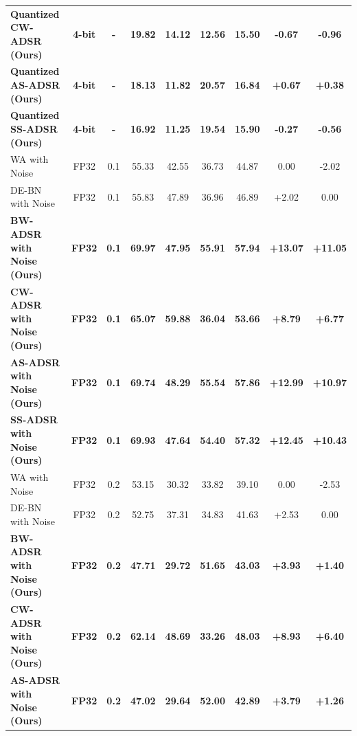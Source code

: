 \documentclass{article}
\theoremstyle{plain}
\theoremstyle{definition}
\theoremstyle{remark}
\begin{document}
\begin{table}[t]
\begin{center}
\begin{small}
\begin{sc}
\begin{tabular}{lcccccccc}
\textbf{Quantized CW-ADSR (Ours)} & \textbf{4-bit} & \textbf{-} & \textbf{19.82} & \textbf{14.12} & \textbf{12.56} & \textbf{15.50} & \textbf{-0.67} & \textbf{-0.96} \\
\textbf{Quantized AS-ADSR (Ours)} & \textbf{4-bit} & \textbf{-} & \textbf{18.13} & \textbf{11.82} & \textbf{20.57} & \textbf{16.84} & \textbf{+0.67} & \textbf{+0.38} \\
\textbf{Quantized SS-ADSR (Ours)} & \textbf{4-bit} & \textbf{-} & \textbf{16.92} & \textbf{11.25} & \textbf{19.54} & \textbf{15.90} & \textbf{-0.27} & \textbf{-0.56} \\
\midrule
WA with Noise & FP32 & 0.1 & 55.33 & 42.55 & 36.73 & 44.87 & 0.00 & -2.02 \\
DE-BN with Noise & FP32 & 0.1 & 55.83 & 47.89 & 36.96 & 46.89 & +2.02 & 0.00 \\
\textbf{BW-ADSR with Noise (Ours)} & \textbf{FP32} & \textbf{0.1} & \textbf{69.97} & \textbf{47.95} & \textbf{55.91} & \textbf{57.94} & \textbf{+13.07} & \textbf{+11.05} \\
\textbf{CW-ADSR with Noise (Ours)} & \textbf{FP32} & \textbf{0.1} & \textbf{65.07} & \textbf{59.88} & \textbf{36.04} & \textbf{53.66} & \textbf{+8.79} & \textbf{+6.77} \\
\textbf{AS-ADSR with Noise (Ours)} & \textbf{FP32} & \textbf{0.1} & \textbf{69.74} & \textbf{48.29} & \textbf{55.54} & \textbf{57.86} & \textbf{+12.99} & \textbf{+10.97} \\
\textbf{SS-ADSR with Noise (Ours)} & \textbf{FP32} & \textbf{0.1} & \textbf{69.93} & \textbf{47.64} & \textbf{54.40} & \textbf{57.32} & \textbf{+12.45} & \textbf{+10.43} \\
\midrule
WA with Noise & FP32 & 0.2 & 53.15 & 30.32 & 33.82 & 39.10 & 0.00 & -2.53 \\
DE-BN with Noise & FP32 & 0.2 & 52.75 & 37.31 & 34.83 & 41.63 & +2.53 & 0.00 \\
\textbf{BW-ADSR with Noise (Ours)} & \textbf{FP32} & \textbf{0.2} & \textbf{47.71} & \textbf{29.72} & \textbf{51.65} & \textbf{43.03} & \textbf{+3.93} & \textbf{+1.40} \\
\textbf{CW-ADSR with Noise (Ours)} & \textbf{FP32} & \textbf{0.2} & \textbf{62.14} & \textbf{48.69} & \textbf{33.26} & \textbf{48.03} & \textbf{+8.93} & \textbf{+6.40} \\
\textbf{AS-ADSR with Noise (Ours)} & \textbf{FP32} & \textbf{0.2} & \textbf{47.02} & \textbf{29.64} & \textbf{52.00} & \textbf{42.89} & \textbf{+3.79} & \textbf{+1.26} \\

\end{tabular}
\end{sc}
\end{small}
\end{center}
\end{table}
\end{document}
